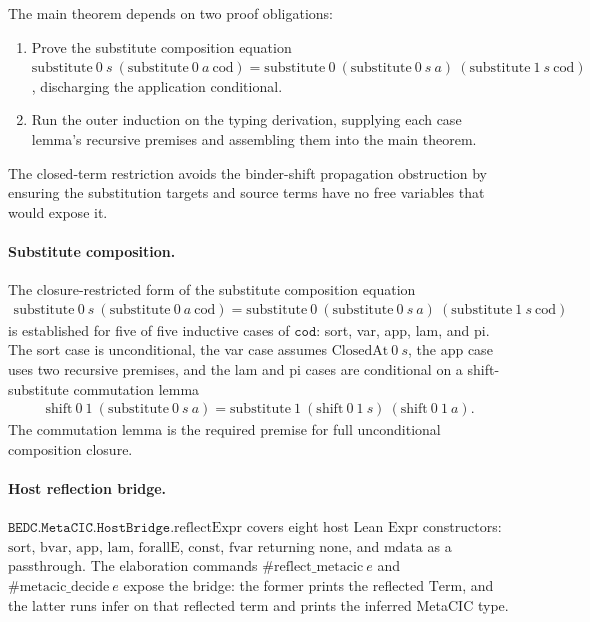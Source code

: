 The main theorem depends on two proof obligations:
\begin{enumerate}
  \item Prove the substitute composition equation
    $\mathrm{substitute}\ 0\ s\ (\mathrm{substitute}\ 0\ a\ \mathrm{cod})
    = \mathrm{substitute}\ 0\ (\mathrm{substitute}\ 0\ s\ a)\
      (\mathrm{substitute}\ 1\ s\ \mathrm{cod})$, discharging the
    application conditional.
  \item Run the outer induction on the typing derivation, supplying each
    case lemma's recursive premises and assembling them into the main theorem.
\end{enumerate}

The closed-term restriction avoids the binder-shift propagation obstruction by
ensuring the substitution targets and source terms have no free variables that
would expose it.

\paragraph{Substitute composition.} The closure-restricted form of
the substitute composition equation
$$
\begin{aligned}
  \mathrm{substitute}\ 0\ s\ (\mathrm{substitute}\ 0\ a\ \mathrm{cod}) =
  \mathrm{substitute}\ 0\ (\mathrm{substitute}\ 0\ s\ a)\
    (\mathrm{substitute}\ 1\ s\ \mathrm{cod})
\end{aligned}
$$
is established for five of five inductive cases of $\texttt{cod}$:
sort, var, app, lam, and pi. The sort case is unconditional, the var
case assumes $\mathrm{ClosedAt}\ 0\ s$, the app case uses two recursive
premises, and the lam and pi cases are conditional on a
shift-substitute commutation lemma
$$
\begin{aligned}
  \mathrm{shift}\ 0\ 1\ (\mathrm{substitute}\ 0\ s\ a) =
  \mathrm{substitute}\ 1\ (\mathrm{shift}\ 0\ 1\ s)\
    (\mathrm{shift}\ 0\ 1\ a).
\end{aligned}
$$
The commutation lemma is the required premise for full unconditional
composition closure.

\paragraph{Host reflection bridge.}
$\texttt{BEDC.MetaCIC.HostBridge}.\mathrm{reflectExpr}$ covers eight
host Lean $\mathrm{Expr}$ constructors: $\mathrm{sort}$,
$\mathrm{bvar}$, $\mathrm{app}$, $\mathrm{lam}$,
$\mathrm{forallE}$, $\mathrm{const}$, $\mathrm{fvar}$ returning
$\mathrm{none}$, and $\mathrm{mdata}$ as a passthrough. The elaboration
commands $\#\mathrm{reflect\_metacic}\ e$ and
$\#\mathrm{metacic\_decide}\ e$ expose the bridge: the former prints
the reflected $\mathrm{Term}$, and the latter runs $\mathrm{infer}$ on
that reflected term and prints the inferred MetaCIC type.


